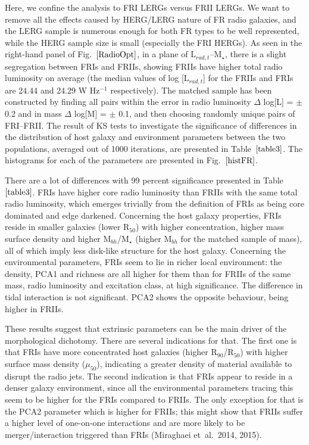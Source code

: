 \documentclass[usenatbib]{mn2e}
\begin{document}
Here, we confine the analysis to FRI LERGs versus FRII LERGs. We want to
remove all the effects caused by HERG/LERG nature of FR radio galaxies,
and the LERG sample is numerous enough for both FR types to be well
represented, while the HERG sample size is small (especially the FRI
HERGs). As seen in the right-hand panel of  Fig.~$\ref{RadioOpt}$, in a plane of
L$_{rad,t}$--M$_{\star}$, there is a slight segregation between FRIs and
FRIIs, showing FRIIs have higher total radio luminosity on average 
 (the median values of log [L$_{rad,t}$] for the FRIIs and FRIs are 
24.44 and 24.29 W Hz$^{-1}$ respectively). The
matched sample has been constructed by finding all pairs within the error
in radio luminosity $\Delta$ log[L] = $\pm$ 0.2 and in mass $\Delta$
log[M] = $\pm$ 0.1, and then choosing randomly unique pairs of
FRI--FRII. The result of KS tests to investigate the significance of
differences in the distribution of host galaxy and environment parameters
between the two populations, averaged out of 1000 iterations, are
presented in Table~$\ref{table3}$. The histograms for each of the
parameters are presented in Fig.~$\ref{histFR}$.

There are a lot of differences with 99 percent significance presented in
Table~$\ref{table3}$. FRIs have higher core radio luminosity than FRIIs
with the same total radio luminosity, which emerges trivially from the
definition of FRIs as being core dominated and edge darkened. Concerning
the host galaxy properties, FRIs reside in smaller galaxies (lower
R$_{50}$) with higher concentration, higher mass surface density and
higher M$_{bh}$/M$_{\star}$ (higher M$_{bh}$ for the matched sample of
mass), all of which imply less disk-like structure for the host galaxy.
Concerning the environmental parameters, FRIs seem to lie in richer local
environment: the density, PCA1 and richness are all higher for them than
for FRIIs of the same mass, radio luminosity and excitation class, at high
significance. The difference in tidal interaction is not significant. PCA2
shows the opposite behaviour, being higher in FRIIs.

These results suggest that extrinsic parameters can be the main
driver of the morphological dichotomy. There are several indications for
that. The first one is that FRIs have more concentrated host galaxies
(higher R$_{90}$/R$_{50}$) with higher surface mass density ($\mu_{50}$),
indicating a greater density of material available to disrupt the radio
jets. The
second indication is that FRIs appear to reside in a denser galaxy
environment, since all the environmental parameters tracing this seem to
be higher for the FRIs compared to FRIIs. The only exception for that is
the PCA2 parameter which is higher for FRIIs; this might show that FRIIs
suffer a higher level of one-on-one interactions and are more likely to be
merger/interaction triggered than FRIs (Miraghaei et~al.\ 2014, 2015).
\end{document}
